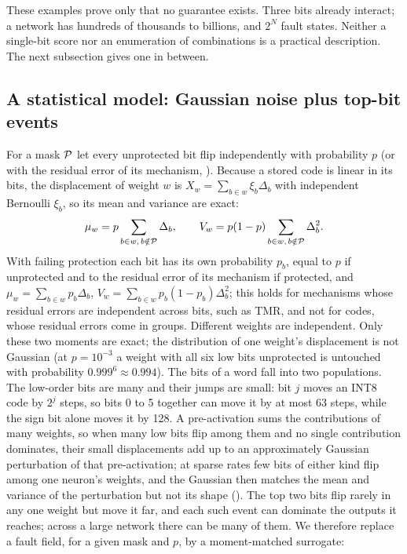 These examples prove only that no guarantee exists. Three bits already interact; a network has hundreds of thousands to billions, and $2^N$ fault states. Neither a single-bit score nor an enumeration of combinations is a practical description. The next subsection gives one in between.

\subsection{A statistical model: Gaussian noise plus top-bit events}\label{sec:model}

For a mask $\mathcal{P}$ let every unprotected bit flip independently with probability $p$ (or with the residual error of its mechanism, ). Because a stored code is linear in its bits, the displacement of weight $w$ is $X_w=\sum_{b\in w}\xi_b\Delta_b$ with independent Bernoulli $\xi_b$, so its mean and variance are exact:
\begin{equation}\label{eq:moments}
\mu_w=p\sum_{b\in w,\,b\notin\mathcal{P}}\Delta_b,\qquad V_w=p(1-p)\sum_{b\in w,\,b\notin\mathcal{P}}\Delta_b^2 .
\end{equation}
With failing protection each bit has its own probability $p_b$, equal to $p$ if unprotected and to the residual error of its mechanism if protected, and $\mu_w=\sum_{b\in w}p_b\Delta_b$, $V_w=\sum_{b\in w}p_b(1-p_b)\Delta_b^2$; this holds for mechanisms whose residual errors are independent across bits, such as TMR, and not for codes, whose residual errors come in groups. Different weights are independent. Only these two moments are exact; the distribution of one weight's displacement is not Gaussian (at $p=10^{-3}$ a weight with all six low bits unprotected is untouched with probability $0.999^6\approx0.994$). The bits of a word fall into two populations. The low-order bits are many and their jumps are small: bit $j$ moves an INT8 code by $2^j$ steps, so bits 0 to 5 together can move it by at most 63 steps, while the sign bit alone moves it by 128. A pre-activation sums the contributions of many weights, so when many low bits flip among them and no single contribution dominates, their small displacements add up to an approximately Gaussian perturbation of that pre-activation; at sparse rates few bits of either kind flip among one neuron's weights, and the Gaussian then matches the mean and variance of the perturbation but not its shape (). The top two bits flip rarely in any one weight but move it far, and each such event can dominate the outputs it reaches; across a large network there can be many of them. We therefore replace a fault field, for a given mask and $p$, by a moment-matched surrogate:
